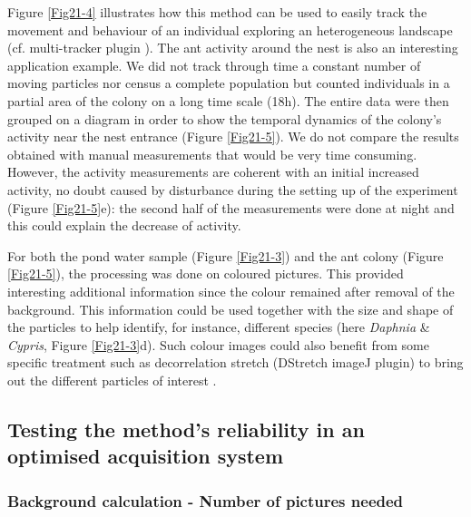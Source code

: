 Figure \ref{Fig21-4} illustrates how this method can be used to easily track the movement
and behaviour of an individual exploring an heterogeneous landscape (cf.
multi-tracker plugin \citealp{kuhn2001a}). The ant activity around the nest is
also an interesting application example. We did not track through time a constant number
of moving particles nor census a complete population but counted individuals in
a partial area of the colony on a long time scale (18h). The entire data were
then grouped on a diagram in order to show the temporal dynamics of the colony’s
activity near the nest entrance (Figure \ref{Fig21-5}). We do not compare the results
obtained with manual measurements that would be very time consuming. However,
the activity measurements are coherent with an initial increased activity, no
doubt caused by disturbance during the setting up of the experiment (Figure \ref{Fig21-5}e):
the second half of the measurements were done at night and this could explain
the decrease of activity.

For both the pond water sample (Figure \ref{Fig21-3}) and the ant colony (Figure \ref{Fig21-5}), the
processing was done on coloured pictures. This provided interesting additional
information since the colour remained after removal of the background. This
information could be used together with the size and shape of the particles to
help identify, for instance, different species (here \textit{Daphnia} \& \textit{Cypris}, Figure
\ref{Fig21-3}d). Such colour images could also benefit from some specific
treatment such as decorrelation stretch (DStretch imageJ plugin) to bring out the different
particles of interest \autocites{harman2011a}.

\subsection{Testing the method’s reliability in an optimised acquisition system}

\subsubsection{Background calculation - Number of pictures needed}


